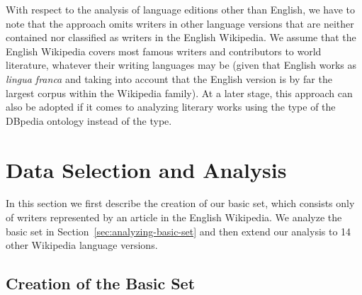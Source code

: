 \documentclass[a4paper,12pt]{scrartcl}
\begin{document}
With respect to the analysis of language editions other than
English, we have to note that the \apInfoboxesEn approach omits
writers in other language versions that are neither contained nor
classified as writers in the English Wikipedia. We assume that the
English Wikipedia covers most famous writers and contributors to world
literature, whatever their writing languages may be (given that
English works as \emph{lingua franca} and taking into account that the
English version is by far the largest corpus within the Wikipedia
family). At a later stage, this approach can also be adopted if it
comes to analyzing literary works using the  type
of the DBpedia ontology instead of the  type.
%
%





\section{Data Selection and Analysis}\label{sec:analysis}

In this section we first describe the creation of our basic set, which
consists only of writers represented by an article in the
English Wikipedia. We analyze the basic set in
Section~\ref{sec:analyzing-basic-set} and then extend our analysis to
14 other Wikipedia language versions.


\subsection{Creation of the Basic Set}\label{sec:creation-dataset}
\end{document}
